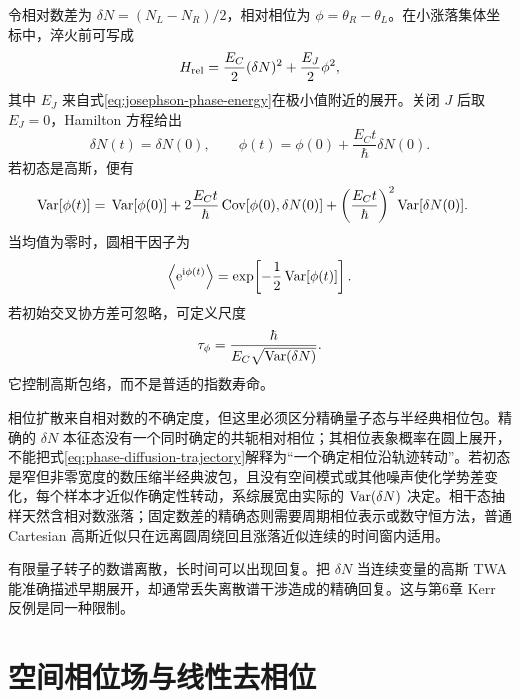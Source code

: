 令相对数差为 $\delta N=(N_L-N_R)/2$，相对相位为
$\phi=\theta_R-\theta_L$。在小涨落集体坐标中，淬火前可写成
\begin{equation}
  H_{\rm rel}=\frac{E_C}{2}(\delta N)^2
  +\frac{E_J}{2}\phi^2,
  \label{eq:relative-collective-hamiltonian}
\end{equation}
其中 $E_J$ 来自式\eqref{eq:josephson-phase-energy}在极小值附近的展开。关闭 $J$ 后取 $E_J=0$，Hamilton 方程给出
\begin{equation}
  \delta N(t)=\delta N(0),
  \qquad
  \phi(t)=\phi(0)+\frac{E_Ct}{\hbar}\delta N(0).
  \label{eq:phase-diffusion-trajectory}
\end{equation}
若初态是高斯，便有
\begin{align}
  \operatorname{Var}[\phi(t)]={}&\operatorname{Var}[\phi(0)]
  +2\frac{E_Ct}{\hbar}\operatorname{Cov}[\phi(0),\delta N(0)]
  +\left(\frac{E_Ct}{\hbar}\right)^2\operatorname{Var}[\delta N(0)].
  \label{eq:phase-variance-growth}
\end{align}
当均值为零时，圆相干因子为
\begin{equation}
  \left\langle \mathrm{e}^{\mathrm{i}\phi(t)}\right\rangle
  =\exp\!\left[-\frac12\operatorname{Var}[\phi(t)]\right].
  \label{eq:gaussian-phase-coherence}
\end{equation}
若初始交叉协方差可忽略，可定义尺度
\begin{equation}
  \tau_\phi=\frac{\hbar}{E_C\sqrt{\operatorname{Var}(\delta N)}}.
  \label{eq:phase-diffusion-time}
\end{equation}
它控制高斯包络，而不是普适的指数寿命。

相位扩散来自相对数的不确定度，但这里必须区分精确量子态与半经典相位包。精确的 $\delta N$ 本征态没有一个同时确定的共轭相对相位；其相位表象概率在圆上展开，不能把式\eqref{eq:phase-diffusion-trajectory}解释为“一个确定相位沿轨迹转动”。若初态是窄但非零宽度的数压缩半经典波包，且没有空间模式或其他噪声使化学势差变化，每个样本才近似作确定性转动，系综展宽由实际的 $\operatorname{Var}(\delta N)$ 决定。相干态抽样天然含相对数涨落；固定数差的精确态则需要周期相位表示或数守恒方法，普通 Cartesian 高斯近似只在远离圆周绕回且涨落近似连续的时间窗内适用。

有限量子转子的数谱离散，长时间可以出现回复。把 $\delta N$ 当连续变量的高斯 TWA 能准确描述早期展开，却通常丢失离散谱干涉造成的精确回复。这与第6章 Kerr 反例是同一种限制。

\section{空间相位场与线性去相位}

